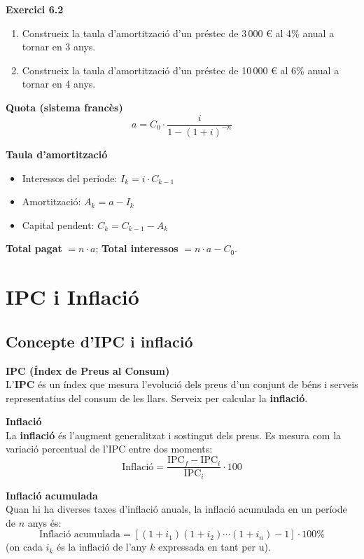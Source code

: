 \documentclass[12pt]{article}
\begin{document}
\begin{exercici}
\textbf{Exercici 6.2}\\
\begin{enumerate}[label=\alph*)]
    \item Construeix la taula d'amortització d'un préstec de 3\,000 € al 4\% anual a tornar en 3 anys.
    \item Construeix la taula d'amortització d'un préstec de 10\,000 € al 6\% anual a tornar en 4 anys.
\end{enumerate}
\end{exercici}

\begin{resum}[title=Resum 6: Amortització de Préstecs]
\textbf{Quota (sistema francès)}
\[
a = C_0 \cdot \dfrac{i}{1 - (1+i)^{-n}}
\]

\textbf{Taula d'amortització}
\begin{itemize}
    \item Interessos del període: $I_k = i \cdot C_{k-1}$
    \item Amortització: $A_k = a - I_k$
    \item Capital pendent: $C_k = C_{k-1} - A_k$
\end{itemize}

\textbf{Total pagat} $= n \cdot a$; \quad \textbf{Total interessos} $= n \cdot a - C_0$.
\end{resum}

\newpage

\section{IPC i Inflació}

\subsection{Concepte d'IPC i inflació}

\begin{concept}
\textbf{IPC (Índex de Preus al Consum)}\\
L'\textbf{IPC} és un índex que mesura l'evolució dels preus d'un conjunt de béns i serveis representatius del consum de les llars. Serveix per calcular la \textbf{inflació}.

\textbf{Inflació}\\
La \textbf{inflació} és l'augment generalitzat i sostingut dels preus. Es mesura com la variació percentual de l'IPC entre dos moments:
\[
\text{Inflació} = \dfrac{\text{IPC}_f - \text{IPC}_i}{\text{IPC}_i} \cdot 100
\]

\textbf{Inflació acumulada}\\
Quan hi ha diverses taxes d'inflació anuals, la inflació acumulada en un període de $n$ anys és:
\[
\text{Inflació acumulada} = \left[(1+i_1)(1+i_2)\cdots(1+i_n) - 1\right] \cdot 100\%
\]
(on cada $i_k$ és la inflació de l'any $k$ expressada en tant per u).
\end{concept}
\end{document}
